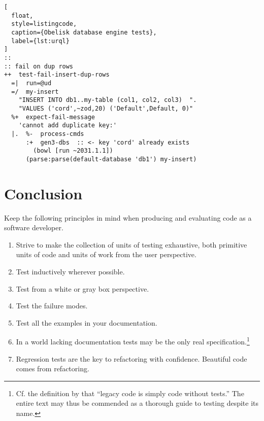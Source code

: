 \documentclass[twoside]{article}
\begin{document}
\begin{lstlisting}[
  float,
  style=listingcode,
  caption={Obelisk database engine tests},
  label={lst:urql}
]
::
:: fail on dup rows
++  test-fail-insert-dup-rows
  =|  run=@ud
  =/  my-insert
    "INSERT INTO db1..my-table (col1, col2, col3)  ".
    "VALUES ('cord',~zod,20) ('Default',Default, 0)"
  %+  expect-fail-message
    'cannot add duplicate key:'
  |.  %-  process-cmds
      :+  gen3-dbs  :: <- key 'cord' already exists
        (bowl [run ~2031.1.1])
      (parse:parse(default-database 'db1') my-insert)
\end{lstlisting}

\section{Conclusion}

Keep the following principles in mind when producing and evaluating code as a software developer.

\begin{enumerate}
  \item  Strive to make the collection of units of testing exhaustive, both primitive units of code and units of work from the user perspective.
  \item  Test inductively wherever possible.
  \item  Test from a white or gray box perspective.
  \item  Test the failure modes.
  \item  Test all the examples in your documentation.
  \item  In a world lacking documentation tests may be the only real specification.\footnote{Cf. the definition by \citeauthor[p. xvi]{Feathers2005} that “legacy code is simply code without tests.”  The entire text may thus be commended as a thorough guide to testing despite its name.}
  \item  Regression tests are the key to refactoring with confidence. Beautiful code comes from refactoring.
\end{enumerate}

\printbibliography
\end{document}
